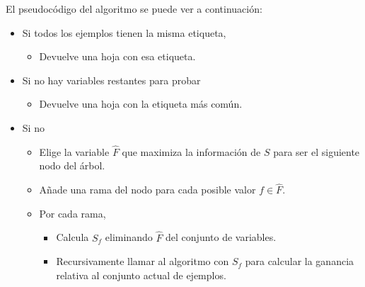 El pseudocódigo del algoritmo se puede ver a continuación:

\begin{itemize}
\item Si todos los ejemplos tienen la misma etiqueta,

\begin{itemize}
\item Devuelve una hoja con esa etiqueta.
\end{itemize}

\item Si no hay variables restantes para probar

\begin{itemize}
\item Devuelve una hoja con la etiqueta más común.
\end{itemize}

\item Si no

\begin{itemize}
\item Elige la variable $\hat{F}$ que maximiza la información de $S$ para ser el siguiente nodo del árbol.
\item Añade una rama del nodo para cada posible valor $f \in \hat{F}$.
\item Por cada rama,

\begin{itemize}
\item Calcula $S_f$ eliminando $\hat{F}$ del conjunto de variables.
\item Recursivamente llamar al algoritmo con $S_f$ para calcular la ganancia relativa al conjunto actual de ejemplos.
\end{itemize}

\end{itemize}

\end{itemize}

